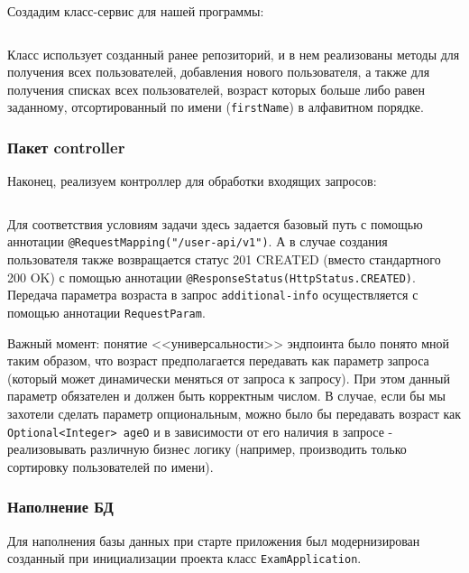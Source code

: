 \documentclass[a4paper, 14pt]{article}
\begin{document}
Создадим класс-сервис для нашей программы:

\normalsize
\inputminted[frame=single]{Java}{../src/main/java/ru/vspochernin/exam/service/UserService.java}
\large

Класс использует созданный ранее репозиторий, и в нем реализованы методы для получения всех пользователей, добавления нового пользователя, а также для получения списках всех пользователей, возраст которых больше либо равен заданному, отсортированный по имени (\texttt{firstName}) в алфавитном порядке.

\subsubsection{Пакет controller}

Наконец, реализуем контроллер для обработки входящих запросов:

\normalsize
\inputminted[frame=single]{Java}{../src/main/java/ru/vspochernin/exam/controller/UserController.java}
\large

Для соответствия условиям задачи здесь задается базовый путь с помощью аннотации \texttt{@RequestMapping("/user-api/v1")}. А в случае создания пользователя также возвращается статус 201 CREATED (вместо стандартного 200 OK) с помощью аннотации \texttt{@ResponseStatus(HttpStatus.CREATED)}. Передача параметра возраста в запрос \texttt{additional-info} осуществляется с помощью аннотации \texttt{RequestParam}.

Важный момент: понятие <<универсальности>> эндпоинта было понято мной таким образом, что возраст предполагается передавать как параметр запроса (который может динамически меняться от запроса к запросу). При этом данный параметр обязателен и должен быть корректным числом. В случае, если бы мы захотели сделать параметр опциональным, можно было бы передавать возраст как \texttt{Optional<Integer> ageO} и в зависимости от его наличия в запросе - реализовывать различную бизнес логику (например, производить только сортировку пользователей по имени).

\subsubsection{Наполнение БД}

Для наполнения базы данных при старте приложения был модернизирован созданный при инициализации проекта класс \texttt{ExamApplication}.

\normalsize
\inputminted[frame=single]{Java}{../src/main/java/ru/vspochernin/exam/ExamApplication.java}
\large
\end{document}
